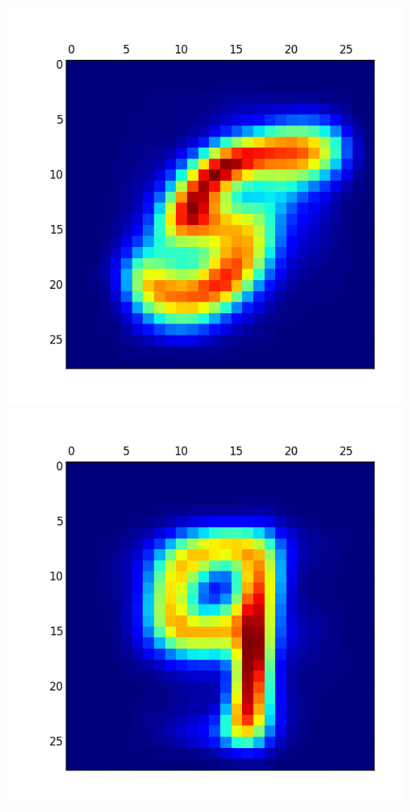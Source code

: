 \documentclass[11pt]{article}
\begin{document}
\begin{itemize}
\includegraphics[scale = 0.5]{28.png}
\includegraphics[scale = 0.5]{29.png}


\end{itemize}
\end{document}
